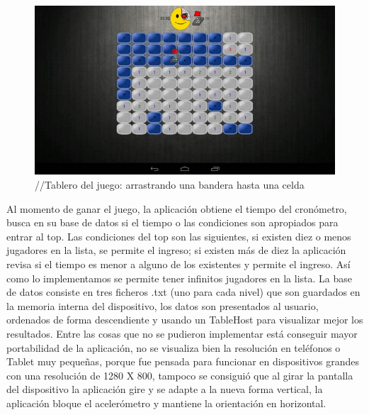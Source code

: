 \documentclass[11pt]{article} %
\begin{document}
\begin{figure}[H]
 \begin{center}
    \includegraphics{imagenes_Documentacion/fig2}
\end{center}
\caption {//Tablero del juego: arrastrando una bandera hasta una celda}
\label{Figura 2}
\end{figure}


Al momento de ganar el juego, la aplicación obtiene el tiempo del cronómetro, busca en su base de datos si el tiempo o las condiciones son apropiados para entrar al top. Las condiciones del top son las siguientes, si existen diez o menos jugadores en la lista, se permite el ingreso; si existen más de diez la aplicación revisa si el tiempo es menor a alguno de los existentes y permite el ingreso.  Así como lo implementamos se permite tener infinitos jugadores en la lista.
La base de datos consiste en tres  ficheros .txt (uno para cada nivel) que son guardados en la memoria interna del dispositivo, los datos son presentados al usuario, ordenados de forma descendiente y usando un TableHost para visualizar mejor los resultados.
Entre las cosas que no se pudieron implementar está conseguir mayor portabilidad de la aplicación, no se visualiza bien la resolución en teléfonos o Tablet muy pequeñas, porque fue pensada para funcionar en dispositivos grandes con una resolución de 1280 X 800, tampoco se consiguió que al girar la pantalla del dispositivo la aplicación gire y se adapte a la nueva forma vertical, la aplicación bloque el acelerómetro y mantiene la orientación en horizontal. 
\end{document}
